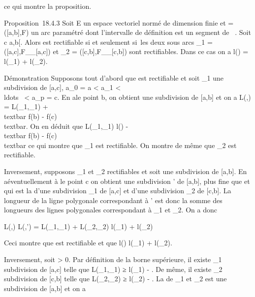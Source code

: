 \documentclass[]{article}
\begin{document}
ce qui montre la proposition.

Proposition~18.4.3 Soit E un espace vectoriel normé de dimension finie
et \Gamma = ({[}a,b{]},F) un arc paramétré dont l'intervalle de définition
est un segment de ~. Soit c \in{]}a,b{[}. Alors \Gamma est rectifiable si et
seulement si~les deux sous arcs \Gamma\_1 =
({[}a,c{]},F\_\textbar{}\_{[}a,c{]}) et \Gamma\_2 =
({[}c,b{]},F\_\textbar{}\_{[}c,b{]}) sont rectifiables.
Dans ce cas on a l(\Gamma) = l(\Gamma\_1) + l(\Gamma\_2).

Démonstration Supposons tout d'abord que \Gamma est rectifiable et soit
\sigma\_1 une subdivision de {[}a,c{]}, a\_0 = a \textless{}
a\_1 \textless{}
\\ldots~ \textless{}
a\_p = c. En a\jmathoutant le point b, on obtient une subdivision \sigma
de {[}a,b{]} et on a L(\Gamma,\sigma) = L(\Gamma\_1,\sigma\_1)
+\\textbar{} f(b) - f(c)\\textbar{}. On en
déduit que L(\Gamma\_1,\sigma\_1) \leq l(\Gamma)
-\\textbar{} f(b) - f(c)\\textbar{} ce qui
montre que \Gamma\_1 est rectifiable. On montre de même que
\Gamma\_2 est rectifiable.

Inversement, supposons \Gamma\_1 et \Gamma\_2 rectifiables et soit
\sigma une subdivision de {[}a,b{]}. En a\jmathoutant éventuellement à \sigma le point
c on obtient une subdivision \sigma' de {[}a,b{]}, plus fine que \sigma et qui est
la \jmathuxtaposition d'une subdivision \sigma\_1 de {[}a,c{]} et d'une
subdivision \sigma\_2 de {[}c,b{]}. La longueur de la ligne
polygonale correspondant à \sigma' est donc la somme des longueurs des lignes
polygonales correspondant à \sigma\_1 et \sigma\_2. On a donc

L(\Gamma,\sigma) \leq L(\Gamma,\sigma') = L(\Gamma\_1,\sigma\_1) +
L(\Gamma\_2,\sigma\_2) \leq l(\Gamma\_1) + l(\Gamma\_2)

Ceci montre que \Gamma est rectifiable et que l(\Gamma) \leq l(\Gamma\_1) +
l(\Gamma\_2).

Inversement, soit \epsilon \textgreater{} 0. Par définition de la borne
supérieure, il existe \sigma\_1 subdivision de {[}a,c{]} telle que
L(\Gamma\_1,\sigma\_1) ≥ l(\Gamma\_1) - \epsilon
{} . De même, il existe \sigma\_2 subdivision
de {[}c,b{]} telle que L(\Gamma\_2,\sigma\_2) ≥ l(\Gamma\_2)
- \epsilon {} . La \jmathuxtaposition \sigma de \sigma\_1 et
\sigma\_2 est une subdivision de {[}a,b{]} et on a
\end{document}

